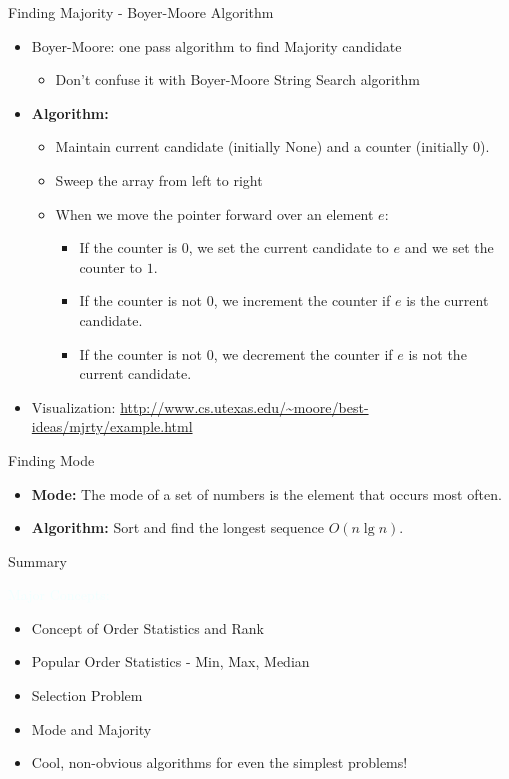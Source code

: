 \documentclass{beamer}
\newcommand{\tblue}[1]{{\Large {\textcolor{azure}{#1}}}}
\begin{document}
\begin{frame}{Finding Majority - Boyer-Moore Algorithm}
\begin{itemize}
    \item Boyer-Moore: one pass algorithm to find Majority candidate
    \begin{itemize}
        \item Don't confuse it with Boyer-Moore String Search algorithm
    \end{itemize}
    \item {\bf Algorithm:}
    \begin{itemize}
        \item Maintain current candidate (initially None) and a counter (initially 0).
        \item Sweep the array from left to right
        \item When we move the pointer forward over an element $e$:
        \begin{itemize}
            \item If the counter is $0$, we set the current candidate to $e$ and we set the counter to $1$.
            \item If the counter is not 0, we increment the counter if $e$ is the current candidate.
            \item If the counter is not 0, we decrement the counter if $e$ is not the current candidate.
        \end{itemize}
    \end{itemize}
    \item Visualization: \url{http://www.cs.utexas.edu/~moore/best-ideas/mjrty/example.html}
\end{itemize}
\end{frame}

\begin{frame}{Finding Mode}
\begin{itemize}
    \item {\bf Mode:} The mode of a set of numbers is the element that occurs most often. 
    \item {\bf Algorithm:} Sort and find the longest sequence $O(n \lg n)$.
\end{itemize}
\end{frame}


\begin{frame}{Summary}

\tblue{Major Concepts:}
\begin{itemize}
\item Concept of Order Statistics and Rank
\item Popular Order Statistics - Min, Max, Median
\item Selection Problem
\item Mode and Majority
\item Cool, non-obvious algorithms for even the simplest problems!
\end{itemize}
\end{frame}
\end{document}

